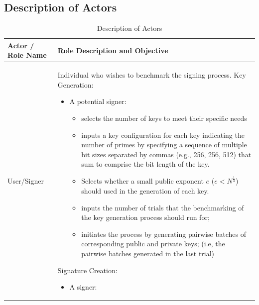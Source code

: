 \documentclass[]{final_report}
\theoremstyle{definition}
\begin{document}
\subsection{Description of Actors}
\begin{table}[H]
    \centering
    \caption{Description of Actors}
    \label{tab:actors_description}
    \begin{tabular}{|l|p{10cm}|}
    \hline
    \textbf{Actor / Role Name} & \textbf{Role Description and Objective} \\
    \hline
    User/Signer & Individual who wishes to benchmark the signing process. Key Generation: 
\begin{itemize}
\item A potential signer:
\begin{itemize}
\item selects the number of keys to meet their specific needs
\item inputs a key configuration for each key indicating the number of primes by specifying a sequence of multiple bit sizes separated by commas (e.g., 256, 256, 512) that sum to comprise the bit length of the key.
\item Selects whether a small public exponent \( e \) (\( e < N^{\frac{1}{4}} \)) should used in the generation of each key.
\item inputs the number of trials that the benchmarking of the key generation process should run for;
\item initiates the process by generating pairwise batches of corresponding public and private keys; (i.e, the pairwise batches generated in the last trial) 
\end{itemize} 
\end{itemize} 
Signature Creation: \begin{itemize}
\item A signer:


\end{itemize}
\end{tabular}
\end{table}
\end{document}
